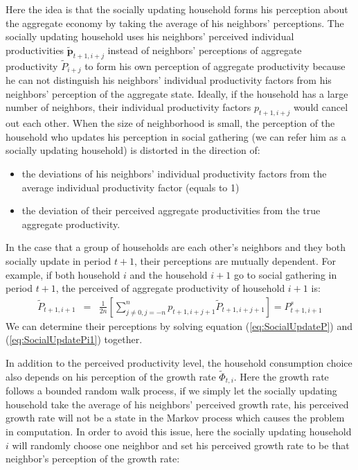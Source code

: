 \documentclass[12pt,letterpaper]{article}
\begin{document}
Here the idea is that the socially updating household forms his perception about the aggregate economy by taking the average of his neighbors' perceptions. The socially updating household uses his neighbors' perceived individual productivities $\tilde{\pmb{p}}_{t+1,i+j}$ instead of neighbors' perceptions of aggregate productivity $\tilde{P}_{i+j}$ to form his own perception of aggregate productivity because he can not distinguish his neighbors' individual productivity factors from his neighbors' perception of the aggregate state. Ideally, if the household has a large number of neighbors, their individual productivity factors $p_{t+1,i+j}$ would cancel out each other. When the size of neighborhood is small, the perception of the household who updates his perception in social gathering (we can refer him as a socially updating household) is distorted in the direction of:
\begin{itemize}
	\item the deviations of his neighbors' individual productivity factors from the average individual productivity factor (equals to 1)
	\item the deviation of their perceived aggregate productivities from the true aggregate productivity.
\end{itemize}
In the case that a group of households are each other's neighbors and they both socially update in period $t+1$,  their perceptions are mutually dependent. For example, if both household $i$ and the household $i+1$ go to social gathering in period $t+1$, the perceived of aggregate productivity of household $i+1$ is:
\begin{eqnarray} \label{eq:SocialUpdatePi1}
\tilde{P}_{t+1,i+1} & = & \frac{1}{2n}\left[\sum_{j\neq0,j=-n}^{n}p_{t+1,i+j+1}\tilde{P}_{t+1,i+j+1}\right]=P^{s}_{t+1,i+1}
\end{eqnarray}
We can determine their perceptions by solving equation (\ref{eq:SocialUpdateP}) and (\ref{eq:SocialUpdatePi1}) together.
\par
In addition to the perceived productivity level, the household consumption choice also depends on his perception of the growth rate $\tilde{\Phi}_{t,i}$. Here the growth rate follows a bounded random walk process, if we simply let the socially updating household take the average of his neighbors' perceived growth rate, his perceived growth rate will not be a state in the Markov process which causes the problem in computation. In order to avoid this issue, here the socially updating household $i$ will randomly choose one neighbor and set his perceived growth rate to be that neighbor's perception of the growth rate:
\end{document}
